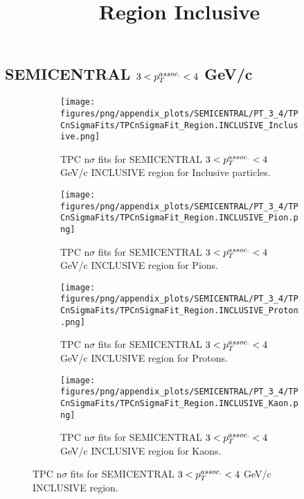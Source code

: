     
            \subsection{SEMICENTRAL $3 < \pTassoc < 4$ GeV/c}
            \begin{figure}[H]
                \title{Region Inclusive}
                \begin{subfigure}[b]{0.5\textwidth}
                    \centering
                    \texttt{[image: figures/png/appendix\_plots/SEMICENTRAL/PT\_3\_4/TPCnSigmaFits/TPCnSigmaFit\_Region.INCLUSIVE\_Inclusive.png]}
                    \caption{TPC n$\sigma$ fits for SEMICENTRAL $3 < \pTassoc < 4$ GeV/c INCLUSIVE region for Inclusive particles.}
                    \label{fig:appendix_SEMICENTRAL_$3 < \pTassoc < 4$ GeV/c_INCLUSIVE_Inclusive}
                \end{subfigure}
                \begin{subfigure}[b]{0.5\textwidth}
                    \centering
                    \texttt{[image: figures/png/appendix\_plots/SEMICENTRAL/PT\_3\_4/TPCnSigmaFits/TPCnSigmaFit\_Region.INCLUSIVE\_Pion.png]}
                    \caption{TPC n$\sigma$ fits for SEMICENTRAL $3 < \pTassoc < 4$ GeV/c INCLUSIVE region for Pions.}
                    \label{fig:appendix_SEMICENTRAL_$3 < \pTassoc < 4$ GeV/c_INCLUSIVE_Pion}
                \end{subfigure}
                \begin{subfigure}[b]{0.5\textwidth}
                    \centering
                    \texttt{[image: figures/png/appendix\_plots/SEMICENTRAL/PT\_3\_4/TPCnSigmaFits/TPCnSigmaFit\_Region.INCLUSIVE\_Proton.png]}
                    \caption{TPC n$\sigma$ fits for SEMICENTRAL $3 < \pTassoc < 4$ GeV/c INCLUSIVE region for Protons.}
                    \label{fig:appendix_SEMICENTRAL_$3 < \pTassoc < 4$ GeV/c_INCLUSIVE_Proton}
                \end{subfigure}
                \begin{subfigure}[b]{0.5\textwidth}
                    \centering
                    \texttt{[image: figures/png/appendix\_plots/SEMICENTRAL/PT\_3\_4/TPCnSigmaFits/TPCnSigmaFit\_Region.INCLUSIVE\_Kaon.png]}
                    \caption{TPC n$\sigma$ fits for SEMICENTRAL $3 < \pTassoc < 4$ GeV/c INCLUSIVE region for Kaons.}
                    \label{fig:appendix_SEMICENTRAL_$3 < \pTassoc < 4$ GeV/c_INCLUSIVE_Kaon}
                \end{subfigure}
                \caption{TPC n$\sigma$ fits for SEMICENTRAL $3 < \pTassoc < 4$ GeV/c INCLUSIVE region.}
                \label{fig:appendix_SEMICENTRAL_$3 < \pTassoc < 4$ GeV/c_INCLUSIVE}
            \end{figure}
